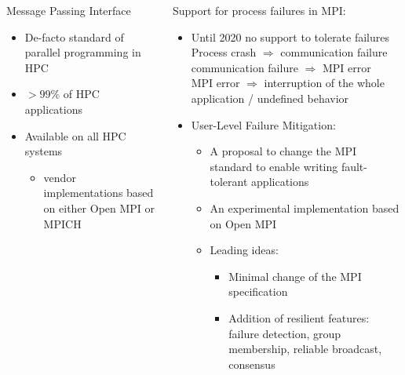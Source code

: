 \begin{frame}
\begin{columns}
\begin{column}{.4\textwidth}
\begin{minipage}{\linewidth}
\begin{center}
          Message Passing Interface
        \end{center}
        \begin{itemize}
        \item De-facto standard of parallel programming in HPC
        \item $>99\%$ of HPC applications
        \item Available on all HPC systems
          \begin{itemize}
          \item vendor implementations based on either Open MPI or MPICH
          \end{itemize}
        \end{itemize}
      \end{minipage}
    \end{column}\begin{column}{.7\linewidth}
      Support for process failures in MPI:
      \begin{itemize}
      \item Until 2020 no support to tolerate failures\\
        Process crash $\Rightarrow$ communication failure \\
        communication failure $\Rightarrow$ MPI error \\
        MPI error $\Rightarrow$ interruption of the whole application / undefined behavior
      \item User-Level Failure Mitigation:\\
        \begin{itemize}
        \item A proposal to change the MPI standard to enable writing fault-tolerant applications
        \item An experimental implementation based on Open MPI
        \item Leading ideas:
          \begin{itemize}
          \item Minimal change of the MPI specification
          \item Addition of resilient features: failure detection, group membership, reliable broadcast, consensus
          \end{itemize}
        \end{itemize}
      \end{itemize}      
    \end{column}
  \end{columns}
  
\end{frame}

